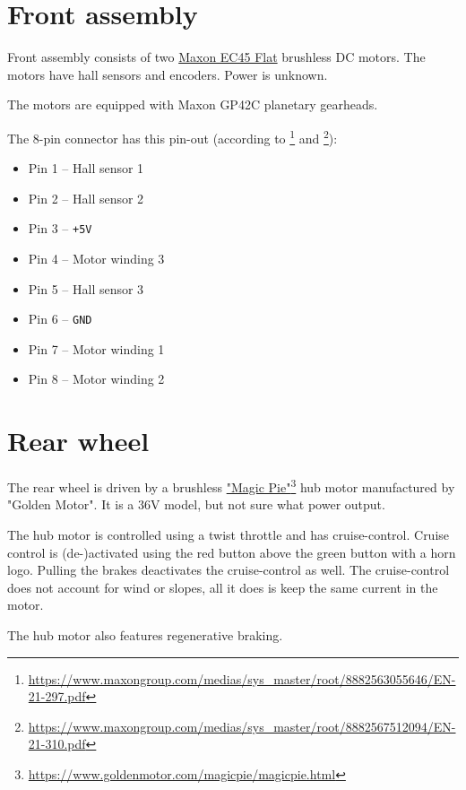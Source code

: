\section{Front assembly}
Front assembly consists of two \href{https://www.maxongroup.com/maxon/view/category/motor?etcc_cu=onsite&etcc_med_onsite=Product&etcc_cmp_onsite=EC+flat+Program&etcc_plc=Overview-Page-Brushless-DC-Motors&etcc_var=%5bcom%5d%23en%23_d_&target=filter&filterCategory=ecflat}{Maxon EC45 Flat} brushless DC motors. The motors have hall sensors and encoders. Power is unknown.

The motors are equipped with Maxon GP42C planetary gearheads.

The 8-pin connector has this pin-out (according to \footnote{\href{https://www.maxongroup.com/medias/sys_master/root/8882563055646/EN-21-297.pdf}{https://www.maxongroup.com/medias/sys\_master/root/8882563055646/EN-21-297.pdf}} and \footnote{\href{https://www.maxongroup.com/medias/sys_master/root/8882567512094/EN-21-310.pdf}{https://www.maxongroup.com/medias/sys\_master/root/8882567512094/EN-21-310.pdf}}):
\begin{itemize}
  \item Pin 1 -- Hall sensor 1
  \item Pin 2 -- Hall sensor 2
  \item Pin 3 -- \verb|+5V|
  \item Pin 4 -- Motor winding 3
  \item Pin 5 -- Hall sensor 3
  \item Pin 6 -- \verb|GND|
  \item Pin 7 -- Motor winding 1
  \item Pin 8 -- Motor winding 2
\end{itemize}

\section{Rear wheel}
The rear wheel is driven by a brushless \href{https://www.goldenmotor.com/magicpie/magicpie.html}{"Magic Pie"}\footnote{\href{https://www.goldenmotor.com/magicpie/magicpie.html}{https://www.goldenmotor.com/magicpie/magicpie.html}} hub motor manufactured by "Golden Motor". It is a 36V model, but not sure what power output.

The hub motor is controlled using a twist throttle and has cruise-control. Cruise control is (de-)activated using the red button above the green button with a horn logo. Pulling the brakes deactivates the cruise-control as well. The cruise-control does not account for wind or slopes, all it does is keep the same current in the motor.

The hub motor also features regenerative braking.
